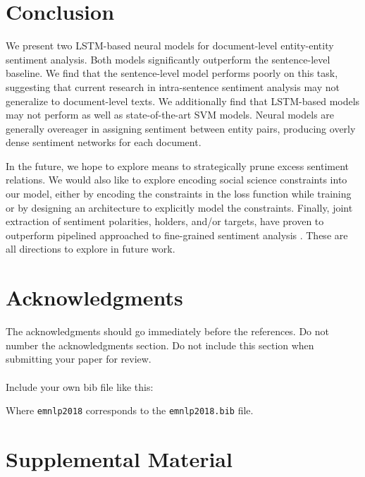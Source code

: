 \documentclass[11pt,a4paper]{article}
\begin{document}
\section{Conclusion}
We present two LSTM-based neural models for document-level entity-entity sentiment analysis. Both models significantly outperform the sentence-level baseline.
We find that the sentence-level model performs poorly on this task, suggesting that current research in intra-sentence sentiment analysis may not generalize to document-level texts.
We additionally find that LSTM-based models may not perform as well as state-of-the-art SVM models.
Neural models are generally overeager in assigning sentiment between entity pairs, producing overly dense sentiment networks for each document.
\par In the future, we hope to explore means to strategically prune excess sentiment relations.
We would also like to explore encoding social science constraints into our model, either by encoding the constraints in the loss function while training or by designing an architecture to explicitly model the constraints.
Finally, joint extraction of sentiment polarities, holders, and/or targets, have proven to outperform pipelined approached to fine-grained sentiment analysis \cite{Yang:13}.
These are all directions to explore in future work.

\section*{Acknowledgments}
The acknowledgments should go immediately before the references.  Do
not number the acknowledgments section. Do not include this section
when submitting your paper for review. \\

 \\

Include your own bib file like this:
{\small\verb||
\verb||}

Where \verb|emnlp2018| corresponds to the {\tt emnlp2018.bib} file.



\appendix

\section{Supplemental Material}
\end{document}
